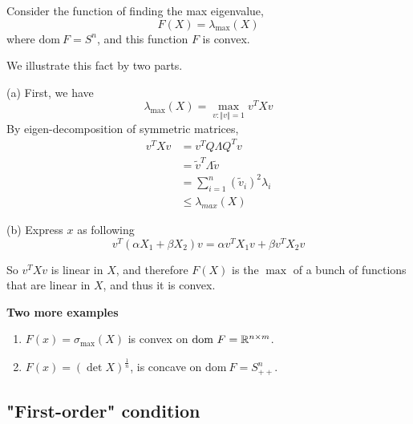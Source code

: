 \vspace{0.5cm}
\begin{example}
Consider the function of finding the max eigenvalue,
$$F(X) = \lambda_{\max}(X)$$
where $\text{dom}\ F = S^n$, and this function $F$ is convex.

We illustrate this fact by two parts.

(a) First, we have
$$\lambda_{\max}(X) = \max_{v:\Vert v\Vert = 1}v^TXv$$
By eigen-decomposition of symmetric matrices,
\begin{align*}
v^TXv 
&= v^TQ\Lambda Q^Tv \\
&= \tilde{v}^T\Lambda \tilde{v}\\
&= \sum^n_{i=1}(\tilde{v}_i)^2\lambda_i \\
&\leq \lambda_{max}(X)
\end{align*}

(b) Express $x$ as following
\begin{equation*}
v^T(\alpha X_1 + \beta X_2)v = \alpha v^TX_1v + \beta v^TX_2v
\end{equation*}

So $v^TXv$ is linear in $X$, and therefore $F(X)$ is the $\max$ of a bunch of functions that are linear in $X$, and thus it is convex.
\end{example}

\vspace{0.3cm}
\noindent\textbf{Two more examples}
\begin{enumerate}
	\item $F(x) = \sigma_{\max} (X)$ is convex on $\text{dom}\ F =\mathbb{R}^{n\times m}$.
	
	\item $F(x) = (\det X)^{\frac{1}{n}}$, is concave on $\text{dom}\ F = S^n_{++}.$
\end{enumerate}

\vspace{0.5cm}
\subsection{"First-order" condition}

